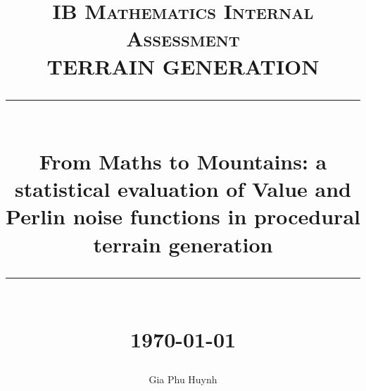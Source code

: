 \documentclass[10pt]{article}
\title{ 
    \normalsize \textsc{IB Mathematics Internal Assessment} \\ [2.5cm]

	\LARGE TERRAIN GENERATION
	\rule{\linewidth}{0.5pt} \\
	\Large \textbf{From Maths to Mountains: a statistical evaluation of Value and Perlin noise functions in procedural terrain generation}
	\rule{\linewidth}{1pt} \\ [1cm]
	\normalsize \today \vspace*{5\baselineskip}
}
\date{}
\author{Gia Phu Huynh}
\begin{document}
\begin{titlepage}
	\maketitle
	\thispagestyle{empty}
\end{titlepage}

\pagebreak
\raggedright


\raggedright


\raggedright


\raggedright


\raggedright


\appendix
\end{document}
